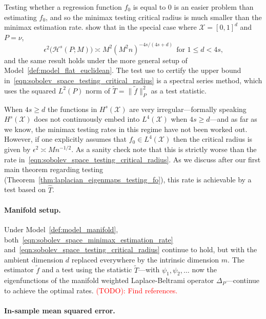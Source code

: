 \documentclass{article}
\newcommand{\1}{\mathbf{1}}
\newcommand{\Xset}{\mathcal{X}}
\newcommand{\Leb}{L}
\newcommand{\mc}[1]{\mathcal{#1}}
\newcommand{\wt}[1]{\widetilde{#1}}
\newcommand{\wh}[1]{\widehat{#1}}
\theoremstyle{alden}
\theoremstyle{aldenthm}
\theoremstyle{definition}
\theoremstyle{remark}
\begin{document}
Testing whether a regression function $f_0$ is equal to $0$ is an easier problem than estimating $f_0$, and so the minimax testing critical radius is much smaller than the minimax estimation rate. \citet{ingster2009} show that in the special case where $\mc{X} = [0,1]^d$ and $P = \nu$,
\begin{equation}
\label{eqn:sobolev_space_testing_critical_radius}
\epsilon^2\bigl(\mc{H}^s(P;M)\bigr) \asymp M^2(M^2n)^{-4s/(4s + d)}~~\textrm{for $1 \leq d < 4s$,}
\end{equation}
and the same result holds under the more general setup of Model~\ref{def:model_flat_euclidean}. The test \citet{ingster2009} use to certify the upper bound in~\eqref{eqn:sobolev_space_testing_critical_radius} is a spectral series method, which uses the squared $L^2(P)$ norm of $\wt{T} = \|\wt{f}\|_{P}^2$ as a test statistic. 

When $4s \geq d$ the functions in $H^s(\Xset)$ are very irregular---formally speaking $H^s(\Xset)$ does not continuously embed into $\Leb^4(\Xset)$ when $4s \geq d$---and as far as we know, the minimax testing rates in this regime have not been worked out. However, if one explicitly assumes that $f_0 \in \Leb^4(\mc{X})$ then the critical radius is given by $\epsilon^2 \asymp Mn^{-1/2}$. As a sanity check note that this is strictly worse than the rate in~\eqref{eqn:sobolev_space_testing_critical_radius}. As we discuss after our first main theorem regarding testing (Theorem~\ref{thm:laplacian_eigenmaps_testing_fo}), this rate is achievable by a test based on $\wh{T}$.

\paragraph{Manifold setup.}
Under Model~\ref{def:model_manifold}, both~\eqref{eqn:sobolev_space_minimax_estimation_rate} and~\eqref{eqn:sobolev_space_testing_critical_radius} continue to hold, but with the ambient dimension $d$ replaced everywhere by the intrinsic dimension $m$. The estimator $\wt{f}$ and a test using the statistic $\wt{T}$---with $\psi_1,\psi_2,\ldots$ now the eigenfunctions of the manifold weighted Laplace-Beltrami operator $\Delta_P$---continue to achieve the optimal rates. \textcolor{red}{(TODO): Find references.}

\paragraph{In-sample mean squared error.}
\end{document}
